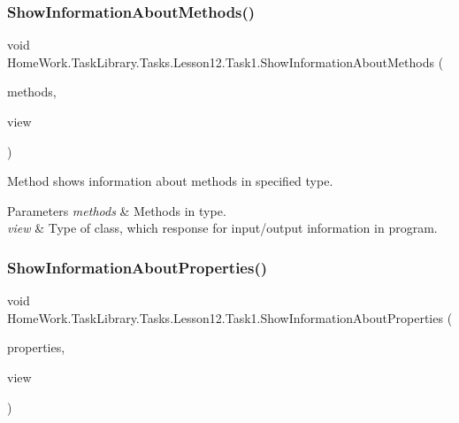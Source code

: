 \subsubsection{\texorpdfstring{ShowInformationAboutMethods()}{ShowInformationAboutMethods()}}
{\footnotesize\ttfamily void Home\+Work.\+Task\+Library.\+Tasks.\+Lesson12.\+Task1.\+Show\+Information\+About\+Methods (\begin{DoxyParamCaption}\item[{Method\+Info \mbox{[}$\,$\mbox{]}}]{methods,  }\item[{I\+Information}]{view }\end{DoxyParamCaption})\hspace{0.3cm}{\ttfamily [private]}}



Method shows information about methods in specified type. 


\begin{DoxyParams}{Parameters}
{\em methods} & Methods in type.\\
\hline
{\em view} & Type of class, which response for input/output information in program.\\
\hline
\end{DoxyParams}
\mbox{\label{class_home_work_1_1_task_library_1_1_tasks_1_1_lesson12_1_1_task1_a42b8865479b5884a39b475b70ef74500}} 
\subsubsection{\texorpdfstring{ShowInformationAboutProperties()}{ShowInformationAboutProperties()}}
{\footnotesize\ttfamily void Home\+Work.\+Task\+Library.\+Tasks.\+Lesson12.\+Task1.\+Show\+Information\+About\+Properties (\begin{DoxyParamCaption}\item[{Property\+Info \mbox{[}$\,$\mbox{]}}]{properties,  }\item[{I\+Information}]{view }\end{DoxyParamCaption})\hspace{0.3cm}{\ttfamily [private]}}




